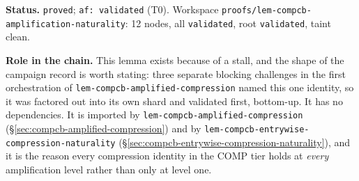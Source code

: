 \medskip
\noindent\textbf{Status.} \texttt{proved}; \texttt{af: validated} (T0). Workspace
\texttt{proofs/lem-compcb-amplification-naturality}: 12 nodes, all \texttt{validated},
root \texttt{validated}, taint clean.

\noindent\textbf{Role in the chain.} This lemma exists because of a stall, and the shape
of the campaign record is worth stating: three separate blocking challenges in the first
orchestration of \texttt{lem-compcb-amplified-compression} named this one identity, so it
was factored out into its own shard and validated first, bottom-up. It has no
dependencies. It is imported by \texttt{lem-compcb-amplified-compression}
(\S\ref{sec:compcb-amplified-compression}) and by
\texttt{lem-compcb-entrywise-compression-naturality}
(\S\ref{sec:compcb-entrywise-compression-naturality}), and it is the reason every
compression identity in the COMP tier holds at \emph{every} amplification level rather
than only at level one.
